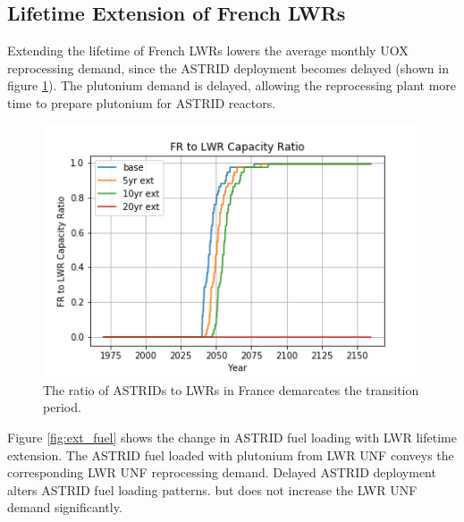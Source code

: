 \subsection{Lifetime Extension of French \glspl{LWR}}\label{sec:life}
Extending the lifetime of French \glspl{LWR} lowers the average
monthly \gls{UOX} reprocessing demand, since the \gls{ASTRID} deployment becomes 
delayed (shown in figure \ref{fig:pow_diff}). The plutonium demand is delayed,
 allowing the reprocessing plant more time to prepare plutonium for \gls{ASTRID} reactors.

\begin{figure}[htbp!]
    \begin{center}
        \includegraphics[scale=0.7]{./images/sensitivity/pow_ratio.png}
    \end{center}
    \caption{The ratio of \glspl{ASTRID} to \glspl{LWR} in France demarcates 
    the transition period.}
    \label{fig:pow_diff}
\end{figure}


Figure \ref{fig:ext_fuel} shows the change in \gls{ASTRID} fuel loading with
\gls{LWR} lifetime extension. The \gls{ASTRID} fuel loaded with plutonium
from \gls{LWR} \gls{UNF} conveys the corresponding \gls{LWR} \gls{UNF} reprocessing demand.
Delayed \gls{ASTRID} deployment alters \gls{ASTRID} fuel loading patterns.
but does not increase the \gls{LWR} \gls{UNF} demand significantly.

